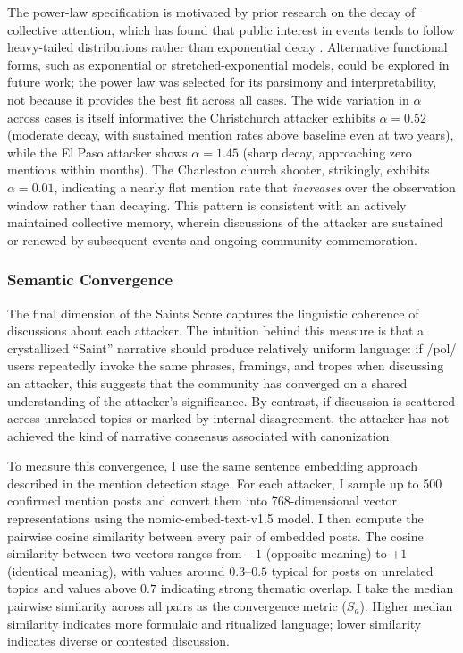 \documentclass[12pt]{article}
\begin{document}
The power-law specification is motivated by prior research on the decay of collective attention, which has found that public interest in events tends to follow heavy-tailed distributions rather than exponential decay \parencite{wu2007novelty, lorenzspreen2019accelerating}. Alternative functional forms, such as exponential or stretched-exponential models, could be explored in future work; the power law was selected for its parsimony and interpretability, not because it provides the best fit across all cases. The wide variation in $\alpha$ across cases is itself informative: the Christchurch attacker exhibits $\alpha = 0.52$ (moderate decay, with sustained mention rates above baseline even at two years), while the El Paso attacker shows $\alpha = 1.45$ (sharp decay, approaching zero mentions within months). The Charleston church shooter, strikingly, exhibits $\alpha = 0.01$, indicating a nearly flat mention rate that \textit{increases} over the observation window rather than decaying. This pattern is consistent with an actively maintained collective memory, wherein discussions of the attacker are sustained or renewed by subsequent events and ongoing community commemoration.

\subsubsection{Semantic Convergence}

The final dimension of the Saints Score captures the linguistic coherence of discussions about each attacker. The intuition behind this measure is that a crystallized ``Saint'' narrative should produce relatively uniform language: if /pol/ users repeatedly invoke the same phrases, framings, and tropes when discussing an attacker, this suggests that the community has converged on a shared understanding of the attacker's significance. By contrast, if discussion is scattered across unrelated topics or marked by internal disagreement, the attacker has not achieved the kind of narrative consensus associated with canonization.

To measure this convergence, I use the same sentence embedding approach described in the mention detection stage. For each attacker, I sample up to 500 confirmed mention posts and convert them into 768-dimensional vector representations using the nomic-embed-text-v1.5 model. I then compute the pairwise cosine similarity between every pair of embedded posts. The cosine similarity between two vectors ranges from $-1$ (opposite meaning) to $+1$ (identical meaning), with values around $0.3$--$0.5$ typical for posts on unrelated topics and values above $0.7$ indicating strong thematic overlap. I take the median pairwise similarity across all pairs as the convergence metric ($S_a$). Higher median similarity indicates more formulaic and ritualized language; lower similarity indicates diverse or contested discussion.
\end{document}

